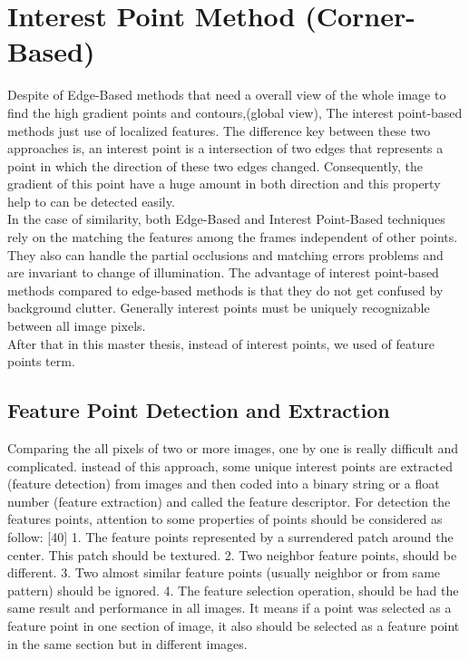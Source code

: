 \section{Interest Point Method (Corner-Based)}
Despite of Edge-Based methods that need a overall view of the whole image to find the high gradient points and contours,(global view), The interest point-based methods just use of localized features. The difference key between these two approaches is, an interest point is a intersection of two edges that represents a point in which the direction of these two edges changed. Consequently, the gradient of this point have a huge amount in both direction and this property help to can be detected easily.\\
In the case of similarity, both Edge-Based and Interest Point-Based techniques rely on the matching the features among the frames independent of other points. They also can handle the partial occlusions and matching errors problems and are invariant to change of illumination. The advantage of interest point-based methods compared to edge-based methods is that they do not get confused by background clutter. Generally interest points must be uniquely recognizable between all image pixels.\\
After that in this master thesis, instead of interest points, we used of feature points term.

\subsection{Feature Point Detection and Extraction}
Comparing the all pixels of two or more images, one by one is really difficult and complicated. instead of this approach, some unique interest points are extracted (feature detection) from images and then coded into a binary string or a float number (feature extraction) and called the feature descriptor. For detection the features points, attention to some properties of points should be considered as follow: [40]
1. The feature points represented by a surrendered patch around the center. This patch should be textured.
2. Two neighbor feature points, should be different.
3. Two almost similar feature points (usually neighbor or from same pattern) should be ignored.
4. The feature selection operation, should be had the same result and performance in all images. It means if a point was selected as a feature point in one section of image, it also should be selected as a feature point in the same section but in different images.

